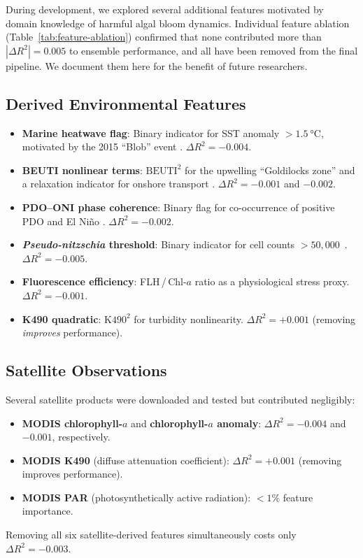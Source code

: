 \documentclass[toxins,article,submit,moreauthors]{Definitions/mdpi}
\begin{document}
During development, we explored several additional features motivated by domain knowledge of harmful algal bloom dynamics. Individual feature ablation (Table~\ref{tab:feature-ablation}) confirmed that none contributed more than $|\Delta R^2| = 0.005$ to ensemble performance, and all have been removed from the final pipeline. We document them here for the benefit of future researchers.

\subsection*{Derived Environmental Features}

\begin{itemize}[nosep]
    \item \textbf{Marine heatwave flag}: Binary indicator for SST anomaly $> \SI{1.5}{\degreeCelsius}$, motivated by the 2015 ``Blob'' event \cite{Bond2015, McCabe2016}. $\Delta R^2 = -0.004$.
    \item \textbf{BEUTI nonlinear terms}: $\text{BEUTI}^2$ for the upwelling ``Goldilocks zone'' \cite{Trainer2020} and a relaxation indicator for onshore transport \cite{Trainer2002}. $\Delta R^2 = -0.001$ and $-0.002$.
    \item \textbf{PDO--ONI phase coherence}: Binary flag for co-occurrence of positive PDO and El Ni\~no \cite{McKibben2017}. $\Delta R^2 = -0.002$.
    \item \textbf{\textit{Pseudo-nitzschia} threshold}: Binary indicator for cell counts $> 50{,}000$~\si{\cellsperL}. $\Delta R^2 = -0.005$.
    \item \textbf{Fluorescence efficiency}: FLH\,/\,Chl-$a$ ratio as a physiological stress proxy. $\Delta R^2 = -0.001$.
    \item \textbf{K490 quadratic}: $\text{K490}^2$ for turbidity nonlinearity. $\Delta R^2 = +0.001$ (removing \textit{improves} performance).
\end{itemize}

\subsection*{Satellite Observations}

Several satellite products were downloaded and tested but contributed negligibly:
\begin{itemize}[nosep]
    \item \textbf{MODIS chlorophyll-$a$} and \textbf{chlorophyll-$a$ anomaly}: $\Delta R^2 = -0.004$ and $-0.001$, respectively.
    \item \textbf{MODIS K490} (diffuse attenuation coefficient): $\Delta R^2 = +0.001$ (removing improves performance).
    \item \textbf{MODIS PAR} (photosynthetically active radiation): $< 1\%$ feature importance.
\end{itemize}
Removing all six satellite-derived features simultaneously costs only $\Delta R^2 = -0.003$.
\end{document}
